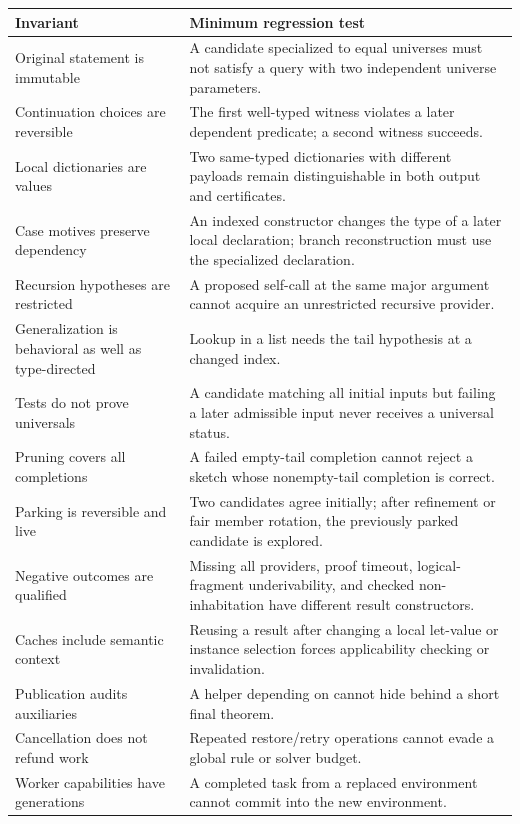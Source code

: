\begin{longtable}{@{}L{0.31\textwidth}L{0.61\textwidth}@{}}
\toprule
Invariant & Minimum regression test \\
\midrule
\endhead
Original statement is immutable & A candidate specialized to equal universes must not satisfy a query with two independent universe parameters. \\
Continuation choices are reversible & The first well-typed witness violates a later dependent predicate; a second witness succeeds. \\
Local dictionaries are values & Two same-typed dictionaries with different payloads remain distinguishable in both output and certificates. \\
Case motives preserve dependency & An indexed constructor changes the type of a later local declaration; branch reconstruction must use the specialized declaration. \\
Recursion hypotheses are restricted & A proposed self-call at the same major argument cannot acquire an unrestricted recursive provider. \\
Generalization is behavioral as well as type-directed & Lookup in a list needs the tail hypothesis at a changed index. \\
Tests do not prove universals & A candidate matching all initial inputs but failing a later admissible input never receives a universal status. \\
Pruning covers all completions & A failed empty-tail completion cannot reject a sketch whose nonempty-tail completion is correct. \\
Parking is reversible and live & Two candidates agree initially; after refinement or fair member rotation, the previously parked candidate is explored. \\
Negative outcomes are qualified & Missing all providers, proof timeout, logical-fragment underivability, and checked non-inhabitation have different result constructors. \\
Caches include semantic context & Reusing a result after changing a local let-value or instance selection forces applicability checking or invalidation. \\
Publication audits auxiliaries & A helper depending on  cannot hide behind a short final theorem. \\
Cancellation does not refund work & Repeated restore/retry operations cannot evade a global rule or solver budget. \\
Worker capabilities have generations & A completed task from a replaced environment cannot commit into the new environment. \\
\bottomrule
\end{longtable}

